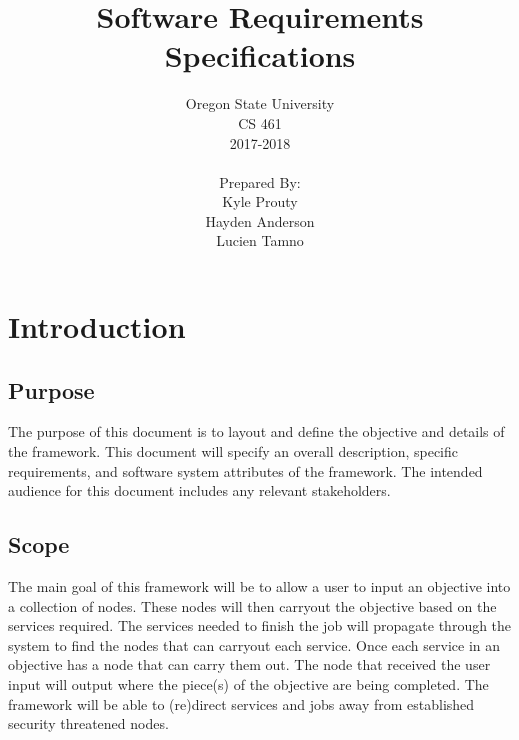 \documentclass[draftclsnofoot, onecolumn, compsoc, 10pt]{IEEEtran}
\title{\huge Software Requirements Specifications}
\author{Oregon State University\\CS 461\\2017-2018\\\\Prepared By:\\ Kyle Prouty\\Hayden Anderson\\Lucien Tamno}
\begin{document}
\begin{titlingpage}
    \maketitle 
\end{titlingpage}

\tableofcontents
\pagebreak

\section{Introduction}
\subsection{Purpose}
The purpose of this document is to layout and define the objective and details of the framework. This document will specify an overall description, specific requirements, and software system attributes of the framework. The intended audience for this document includes any relevant stakeholders. 

\subsection{Scope} %
The main goal of this framework will be to allow a user to input an objective into a collection of nodes. These nodes will then carryout the objective based on the services required. The services needed to finish the job will propagate through the system to find the nodes that can carryout each service. Once each service in an objective has a node that can carry them out. The node that received the user input will output where the piece(s) of the objective are being completed. The framework will be able to (re)direct services and jobs away from established security threatened nodes.  
\end{document}
